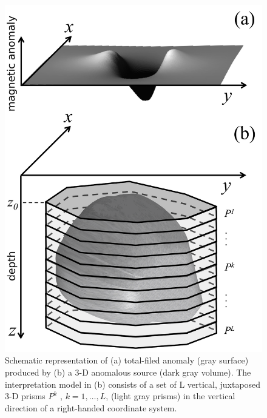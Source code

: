 
\begin{figure}
    \centering
    \includegraphics[scale=1]{figures/observed_data.png}
    \caption{Schematic representation of (a) total-filed anomaly (gray surface) produced by (b) a 3-D anomalous source (dark gray volume). The interpretation model in (b) consists of a set of L vertical, juxtaposed 3-D prisms $P^k$ , $k = 1,\dots, L$, (light gray prisms) in the vertical direction of a right-handed coordinate system.}
    \label{fig:obs}
\end{figure}


